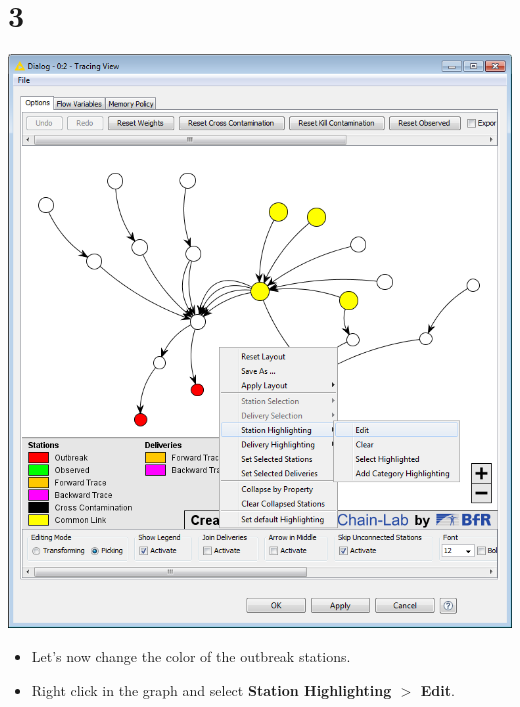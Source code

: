 \documentclass{beamer}
\begin{document}
\section{3}
\begin{frame}
	\begin{center}
  		\includegraphics[height=0.6\textheight]{3.png}
	\end{center}
	\begin{itemize}
		\item Let's now change the color of the outbreak stations.
		\item Right click in the graph and select \textbf{Station Highlighting $>$ Edit}.
	\end{itemize}
\end{frame}
\end{document}
